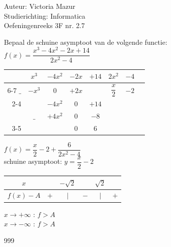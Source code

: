 \documentclass[a4paper]{article}
\begin{document}
  
\noindent \large Auteur: Victoria Mazur \\
\noindent \large Studierichting: Informatica\\
\noindent \large Oefeningenreeks 3F nr. 2.7\\

\medskip

\normalsize

Bepaal de schuine asymptoot van de volgende functie: \\

$ f(x) = \dfrac{x^3 - 4x^2 - 2x + 14}{2x^2 - 4} $ \\

\bigskip

\begin{tabular}{rccccc|cc}
     & $x^3$ & $-4x^2$ & $-2x$ & $+14$ & $2x^2$ & $-4$  \\ \cline{6-7} 
$\_$ & $-x^3$ & $0$ & $+2x$ &  & $\dfrac{x}{2}$ & $-2$ \\ \cline{2-4}
     &  & $-4x^2$ & $0$ & $+14$ &  &  \\
     & $\_$ & $+4x^2$ & $0$ & $-8$ &  &  \\ \cline{3-5}
     &  &  & $0$ & $6$ &  &  \\ 
\end{tabular}

\bigskip

$ f(x) = \dfrac{x}{2} - 2 + \dfrac{6}{2x^2 - 4} $ \\

schuine asymptoot: $ y = \dfrac{x}{2} - 2 $ \\

\bigskip

\begin{tabular}{c|ccccc}
$x$ &  & $-\sqrt{2}$ &  & $\sqrt{2}$ &  \\ \hline
$f(x) - A$ & $+$ & $|$ & $-$ & $|$ & $+$ \\
\end{tabular}

\bigskip

$ x \rightarrow +\infty $ : $ f > A $ \\ 

$ x \rightarrow -\infty $ : $ f > A $ \\

\begin{thebibliography}{999}
\end{thebibliography}
\end{document}

